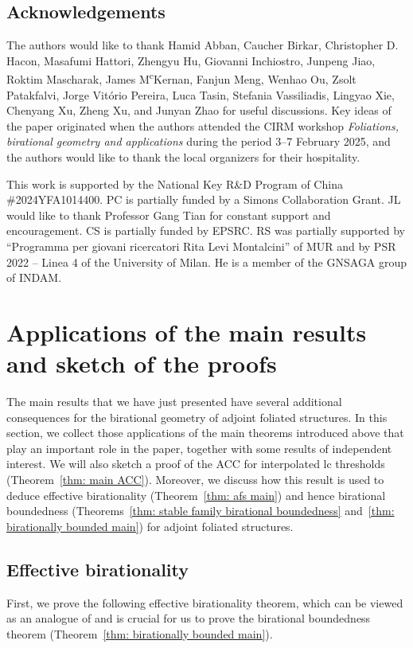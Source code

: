 \documentclass[11pt,reqno]{amsart}
\numberwithin{equation}{section}
\theoremstyle{definition}
\begin{document}
\subsection*{Acknowledgements} The authors would like to thank Hamid Abban, Caucher Birkar, Christopher D. Hacon, Masafumi Hattori, Zhengyu Hu, Giovanni Inchiostro, Junpeng Jiao, Roktim Mascharak, James M\textsuperscript{c}Kernan, Fanjun Meng, Wenhao Ou, Zsolt Patakfalvi, Jorge Vit\'orio Pereira, Luca Tasin, Stefania Vassiliadis, Lingyao Xie, Chenyang Xu, Zheng Xu, and Junyan Zhao for useful discussions. Key ideas of the paper originated when the authors attended the CIRM workshop \emph{Foliations, birational geometry and applications} during the period 3--7 February 2025, and the authors would like to thank the local organizers for their hospitality.

This work is supported by the National Key R\&D Program of China \#\allowbreak 2024YFA1014400. 
PC is partially funded by a Simons Collaboration Grant.
JL would like to thank Professor Gang Tian for constant support and encouragement. 
CS is partially funded by EPSRC. 
RS was partially supported by ``Programma per giovani ricercatori Rita Levi Montalcini'' of MUR and by PSR 2022 -- Linea 4 of the University of Milan. 
He is a member of the GNSAGA group of INDAM.



\section{Applications of the main results and sketch of the proofs}\label{sec: sketch of proof}


The main results that we have just presented have several additional consequences for the birational geometry of adjoint foliated structures. 
In this section, we collect those applications of the main theorems introduced above that play an important role in the paper, together with some results of independent interest. 
We will also sketch a proof of the ACC for interpolated lc thresholds (Theorem~\ref{thm: main ACC}). 
Moreover, we discuss how this result is used to deduce effective birationality (Theorem~\ref{thm: afs main}) and hence birational boundedness (Theorems~\ref{thm: stable family birational boundedness} and~\ref{thm: birationally bounded main})
for adjoint foliated structures.

\subsection*{Effective birationality} First, we prove the following effective birationality theorem, which can be viewed as an analogue of \cite[Theorem~1.3(3)]{HMX14} and is crucial for us to prove the birational boundedness theorem (Theorem~\ref{thm: birationally bounded main}).
\end{document}
